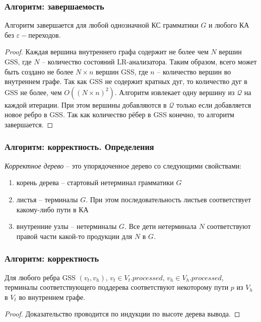 \documentclass{beamer}
\begin{document}
\begin{frame}
    \transwipe[direction=90]
    \frametitle{Алгоритм: завершаемость}
    \begin{theorem}
             Алгоритм завершается для любой однозначной КС грамматики $G$ и любого КА без $\varepsilon-$переходов.
    \end{theorem}

    \begin{proof}
       Каждая вершина внутреннего графа содержит не более чем $N$ вершин GSS, где $N$ -- количество состояний LR-анализатора. Таким образом, всего может быть создано не более $N\times n$ вершин GSS, где $n$
       -- количество вершин во внутреннем графе. Так как GSS не содержит кратных дуг, то количество дуг в GSS не более, чем $O((N\times n)^2)$. Алгоритм извлекает одну вершину из  $\mathcal Q$ на каждой итерации.
       При этом вершины добавляются в $\mathcal Q$ только если добавляется новое ребро в GSS. Так как количество рёбер в GSS конечно, то алгоритм завершается.
    \end{proof}

\end{frame}

\begin{frame}
    \transwipe[direction=90]
    \frametitle{Алгоритм: корректность. Определения}
    \begin{definition}
         \emph{Корректное дерево} -- это упорядоченное дерево со следующими свойствами:
        \begin{enumerate}
            \item корень дерева -- стартовый нетерминал грамматики $G$
            \item листья --  терминалы $G$. При этом последовательность листьев соответствует какому-либо пути в КА
            \item внутренние узлы -- нетерминалы $G$. Все дети нетерминала $N$ соответствуют правой части какой-то продукции для $N$ в $G$.
        \end{enumerate}
    \end{definition}
\end{frame}

\begin{frame}
    \transwipe[direction=90]
    \frametitle{Алгоритм: корректность}
        \begin{lemma}[Lemma 1]
    Для любого ребра GSS $(v_{t}, v_{h})$, $v_{t} \in V_{t}.processed$, $v_{h} \in V_{h}.processed$, терминалы соответствующего поддерева соответствуют некоторому пути $p$ из $V_{h}$ в $V_{t}$ во внутреннем графе.
    \end{lemma}

    \begin{proof}
        Доказательство проводится по индукции по высоте дерева вывода.
    \end{proof}

\end{frame}
\end{document}
